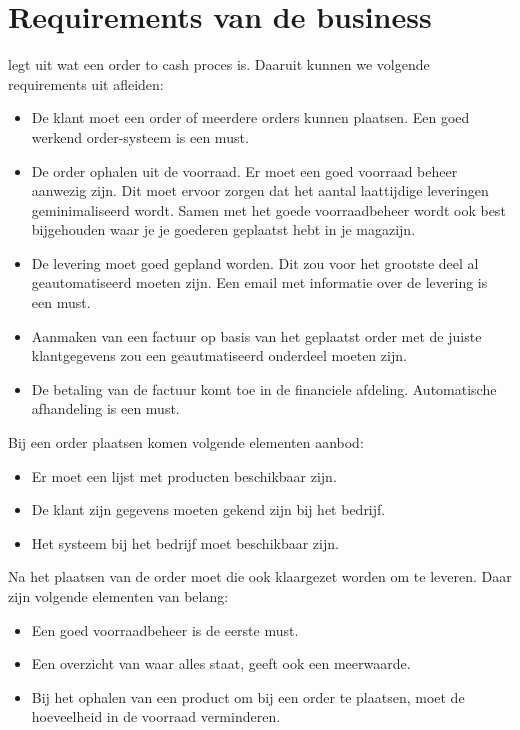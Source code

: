 \section{Requirements van de business}
\textcite{Biedron2018} legt uit wat een order to cash proces is. Daaruit kunnen we volgende requirements uit afleiden:
\begin{itemize}
	\item De klant moet een order of meerdere orders kunnen plaatsen. Een goed werkend order-systeem is een must.
	\item De order ophalen uit de voorraad. Er moet een goed voorraad beheer aanwezig zijn. Dit moet ervoor zorgen dat het aantal laattijdige leveringen geminimaliseerd wordt. Samen met het goede voorraadbeheer wordt ook best bijgehouden waar je je goederen geplaatst hebt in je magazijn.
	\item De levering moet goed gepland worden. Dit zou voor het grootste deel al geautomatiseerd moeten zijn. Een email met informatie over de levering is een must. 
	\item Aanmaken van een factuur op basis van het geplaatst order met de juiste klantgegevens zou een geautmatiseerd onderdeel moeten zijn. 
	\item De betaling van de factuur komt toe in de financiele afdeling. Automatische afhandeling is een must.
\end{itemize}
Bij een order plaatsen komen volgende elementen aanbod:
\begin{itemize}
	\item Er moet een lijst met producten beschikbaar zijn.
	\item De klant zijn gegevens moeten gekend zijn bij het bedrijf.
	\item Het systeem bij het bedrijf moet beschikbaar zijn.
\end{itemize}
Na het plaatsen van de order moet die ook klaargezet worden om te leveren. Daar zijn volgende elementen van belang:
\begin{itemize}
	\item Een goed voorraadbeheer is de eerste must.
	\item Een overzicht van waar alles staat, geeft ook een meerwaarde.
	\item Bij het ophalen van een product om bij een order te plaatsen, moet de hoeveelheid in de voorraad verminderen.
\end{itemize}
